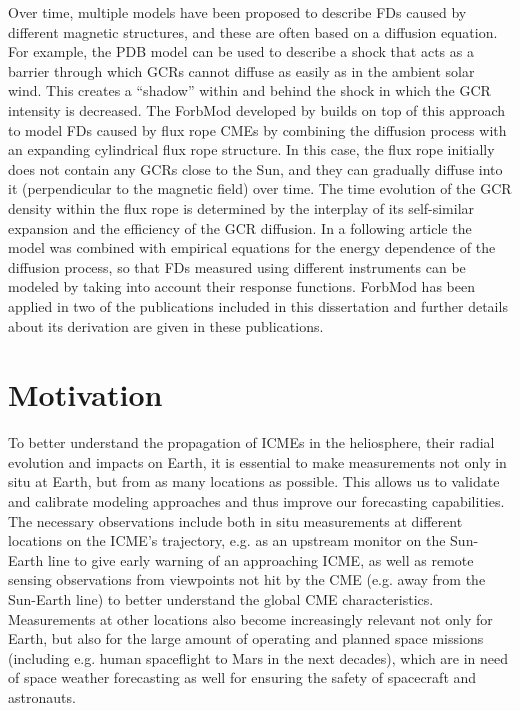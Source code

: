 Over time, multiple models have been proposed to describe \acp{FD} caused by different magnetic structures, and these are often based on a diffusion equation. For example, the \acl{PDB} model \citep[\acs{PDB},][]{Wibberenz-1998} can be used to describe a shock that acts as a barrier through which \acp{GCR} cannot diffuse as easily as in the ambient solar wind. This creates a ``shadow'' within and behind the shock in which the \ac{GCR} intensity is decreased.
The \ac{ForbMod} developed by \citet{Dumbovic2018-ForbMod} builds on top of this approach to model \acp{FD} caused by flux rope \acp{CME} by combining the diffusion process with an expanding cylindrical flux rope structure. In this case, the flux rope initially does not contain any \acp{GCR} close to the Sun, and they can gradually diffuse into it (perpendicular to the magnetic field) over time. The time evolution of the \ac{GCR} density within the flux rope is determined by the interplay of its self-similar expansion and the efficiency of the \ac{GCR} diffusion. In a following article \citep{Dumbovic-2020-ForbMod} the model was combined with empirical equations for the energy dependence of the diffusion process, so that \acp{FD} measured using different instruments can be modeled by taking into account their response functions. \ac{ForbMod} has been applied in two of the publications included in this dissertation \citep{Forstner-2020,Forstner-2021-SolO} and further details about its derivation are given in these publications.

\section{Motivation}
\label{sec:motivation}

To better understand the propagation of \acp{ICME} in the heliosphere, their radial evolution and impacts on Earth, it is essential to make measurements not only in situ at Earth, but from as many locations as possible. This allows us to validate and calibrate modeling approaches and thus improve our forecasting capabilities. The necessary observations include both in situ measurements at different locations on the \ac{ICME}'s trajectory, e.g. as an upstream monitor on the Sun-Earth line to give early warning of an approaching \ac{ICME}, as well as remote sensing observations from viewpoints not hit by the \ac{CME} (e.g. away from the Sun-Earth line) to better understand the global \ac{CME} characteristics. Measurements at other locations also become increasingly relevant not only for Earth, but also for the large amount of operating and planned space missions (including e.g. human spaceflight to Mars in the next decades), which are in need of space weather forecasting as well for ensuring the safety of spacecraft and astronauts.

